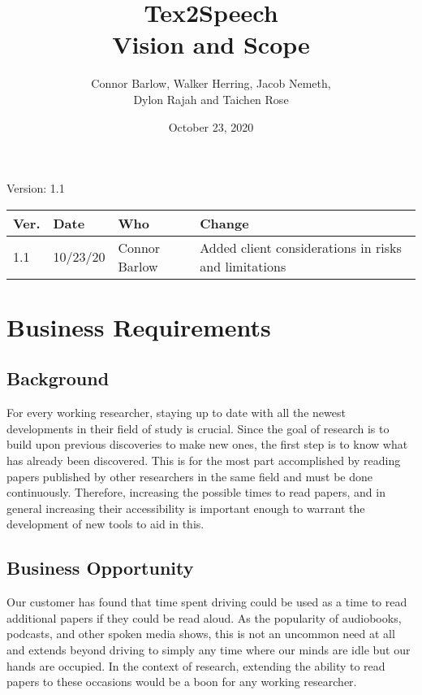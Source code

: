 \documentclass[letterpaper,12pt]{article}
\title{Tex2Speech\\Vision and Scope}
\author{Connor Barlow, Walker Herring, Jacob Nemeth,\\Dylon Rajah and Taichen Rose}
\date{October 23, 2020}
\begin{document}
\maketitle

\begin{center}
  Version: 1.1
\end{center}

\vfill
\begin{tabularx}{\linewidth}{|l|l|l|X|}\hline
Ver. & Date & Who & Change\\\hline
1.1  & 10/23/20  & Connor Barlow  & Added client considerations in risks and limitations\\\hline
\end{tabularx}
\newpage

\section{Business Requirements}
\subsection{Background}
For every working researcher, staying up to date with all the newest developments in their field of study is crucial. Since the goal of research is to build upon previous discoveries to make new ones, the first step is to know what has already been discovered. This is for the most part accomplished by reading papers published by other researchers in the same field and must be done continuously. Therefore, increasing the possible times to read papers, and in general increasing their accessibility is important enough to warrant the development of new tools to aid in this.

\subsection{Business Opportunity}
Our customer has found that time spent driving could be used as a time to read additional papers if they could be read aloud. As the popularity of audiobooks, podcasts, and other spoken media shows, this is not an uncommon need at all and extends beyond driving to simply any time where our minds are idle but our hands are occupied. In the context of research, extending the ability to read papers to these occasions would be a boon for any working researcher.
\end{document}
